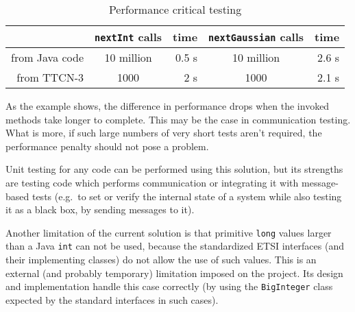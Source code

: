 \begin{table}[htb]
\centering
\begin{tabular}{r | c | r | c | r}
 & \verb=nextInt= calls & time & \verb=nextGaussian= calls & time \\
\hline
from Java code & 10 million & 0.5 s & 10 million & 2.6 s \\
from \ac{TTCN-3} & 1000 & 2 s & 1000 & 2.1 s \\
\end{tabular}
\caption{Performance critical testing\label{tab:random-generation}}
\end{table}

As the example shows,
the difference in performance drops
when the invoked methods take longer to complete.
This may be the case in communication testing.
What is more, if such large numbers of very short tests aren't required,
the performance penalty should not pose a problem.

Unit testing for any code can be performed using this solution,
but its strengths are testing code which performs communication
or integrating it with message-based tests
(e.g.\ to set or verify the internal state of a system
while also testing it as a black box, by sending messages to it).

Another limitation of the current solution is that
primitive \verb=long= values larger than a Java \verb=int= can not be used,
because the standardized \ac{ETSI} interfaces (and their implementing classes)
do not allow the use of such values.
This is an external (and probably temporary) limitation imposed on the project.
Its design and implementation handle this case correctly
(by using the \verb=BigInteger= class
expected by the standard interfaces in such cases).
